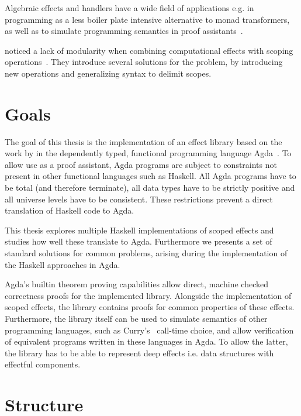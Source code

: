 \documentclass[10pt,a4paper,twoside,notitlepage]{report}
\begin{document}
Algebraic effects and handlers have a wide field of applications e.g. in
programming as a less boiler plate intensive alternative to monad transformers,
as well as to simulate programming semantics in proof
assistants~\cite{DBLP:journals/programming/DylusCT19,DBLP:conf/haskell/ChristiansenDB19}.

\citeauthor{DBLP:conf/haskell/WuSH14} noticed a lack of modularity when
combining computational effects with scoping
operations~\cite{DBLP:conf/haskell/WuSH14}.
They introduce several solutions for the problem, by introducing new operations
and generalizing syntax to delimit scopes.


\section{Goals}

The goal of this thesis is the implementation of an effect library based on the
work by \textcite{DBLP:conf/haskell/WuSH14,DBLP:conf/lics/PirogSWJ18} in
the dependently typed, functional programming language
Agda~\cite{norell:thesis}.
To allow use as a proof assistant, Agda programs are subject to constraints not
present in other functional languages such as Haskell.
All Agda programs have to be total (and therefore terminate), all data types
have to be strictly positive and all universe levels have to be consistent.
These restrictions prevent a direct translation of Haskell code to Agda.

This thesis explores multiple Haskell implementations of scoped effects and
studies how well these translate to Agda.
Furthermore we presents a set of standard solutions for common problems, arising
during the implementation of the Haskell approaches in Agda.

Agda's builtin theorem proving capabilities allow direct, machine checked
correctness proofs for the implemented library.
Alongside the implementation of scoped effects, the library contains proofs for
common properties of these effects.
Furthermore, the library itself can be used to simulate semantics of other
programming languages, such as Curry's~\cite{Hanus95curry} call-time choice, and
allow verification of equivalent programs written in these languages in Agda.
To allow the latter, the library has to be able to represent deep effects i.e.
data structures with effectful components.


\section{Structure}
\end{document}
